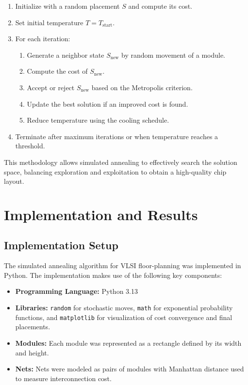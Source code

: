 \documentclass[9pt,a4paper,twoside]{rho-class/rho}
\begin{document}
\begin{enumerate}
    \item Initialize with a random placement $S$ and compute its cost.
    \item Set initial temperature $T = T_{\text{start}}$.
    \item For each iteration:
    \begin{enumerate}
        \item Generate a neighbor state $S_{\text{new}}$ by random movement of a module.
        \item Compute the cost of $S_{\text{new}}$.
        \item Accept or reject $S_{\text{new}}$ based on the Metropolis criterion.
        \item Update the best solution if an improved cost is found.
        \item Reduce temperature using the cooling schedule.
    \end{enumerate}
    \item Terminate after maximum iterations or when temperature reaches a threshold.
\end{enumerate}

This methodology allows simulated annealing to effectively search the solution space, balancing exploration and exploitation to obtain a high-quality chip layout.


\section{Implementation and Results}

\subsection{Implementation Setup}
The simulated annealing algorithm for VLSI floor-planning was implemented in Python. The implementation makes use of the following key components:
\begin{itemize}
    \item \textbf{Programming Language:} Python 3.13
    \item \textbf{Libraries:} \texttt{random} for stochastic moves, \texttt{math} for exponential probability functions, and \texttt{matplotlib} for visualization of cost convergence and final placements.
    \item \textbf{Modules:} Each module was represented as a rectangle defined by its width and height.
    \item \textbf{Nets:} Nets were modeled as pairs of modules with Manhattan distance used to measure interconnection cost.
\end{itemize}
\end{document}
